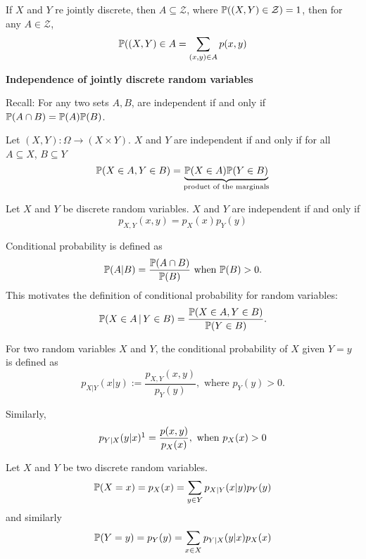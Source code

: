 \documentclass[10pt, a4paper]{article}
\begin{document}
\begin{theorem}
    If $X$ and $Y$ re jointly discrete,
    then $A \subseteq \mathcal{Z}$,
    where $\P((X, Y) \in \mathcal{Z}) = 1$,
    then for any $A \in \mathcal{Z}$,
    \[
    \P((X, Y) \in A = \sum_{(x, y) \in A}p(x, y)
    \]
\end{theorem}

\textbf{Independence of jointly discrete random variables}


Recall:
For any two sets $A, B$,
are independent if and only if $\P(A \cap B) = \P(A)\P(B)$.

\begin{definition}
    Let $(X, Y) : \Omega \rightarrow (X \times Y)$.
    $X$ and $Y$ are independent if and only if for all $A \subseteq X$,
    $B \subseteq Y$
    \[
    \P(X \in A, Y \in B) = \underbrace{\P(X \in A)\P(Y \in B)}_{\text{product of the marginals}}
    \]
\end{definition}

\begin{definition}
    Let $X$ and $Y$ be discrete random variables.
    $X$ and $Y$ are independent if and only if
    \[
    p_{X, Y}(x, y) = p_X(x)p_Y(y)
    \]
\end{definition}

Conditional probability is defined as
\[
\P(A | B) = \frac{\P(A \cap B)}{\P(B)}\text{ when } \P(B) > 0.
\]
This motivates the definition of conditional probability for random variables:
\[
\P(X \in A\,|\,Y \in B) = \frac{\P(X \in A, Y \in B)}{\P(Y \in B)}.
\]

\begin{definition}
    For two random variables $X$ and $Y$,
    the conditional probability of $X$ given $Y = y$ is defined as
    \[
    p_{X|Y}(x | y) := \frac{p_{X, Y}(x, y)}{p_Y(y)},\text{ where } p_Y(y) > 0.
    \]
\end{definition}

Similarly,
\[
p_{Y|X}(y|x)\footnotemark = \frac{p(x, y)}{p_X(x)},\text{ when }p_X(x) > 0
\]

\begin{theorem}
    Let $X$ and $Y$ be two discrete random variables.
    \[
    \P(X = x) = p_X(x) = \sum_{y \in Y}p_{X | Y}(x | y)p_Y(y)
    \]
    and similarly
    \[
    \P(Y = y) = p_Y(y) = \sum_{x \in X}p_{Y | X}(y | x)p_X(x)
    \]
\end{theorem}
\end{document}
